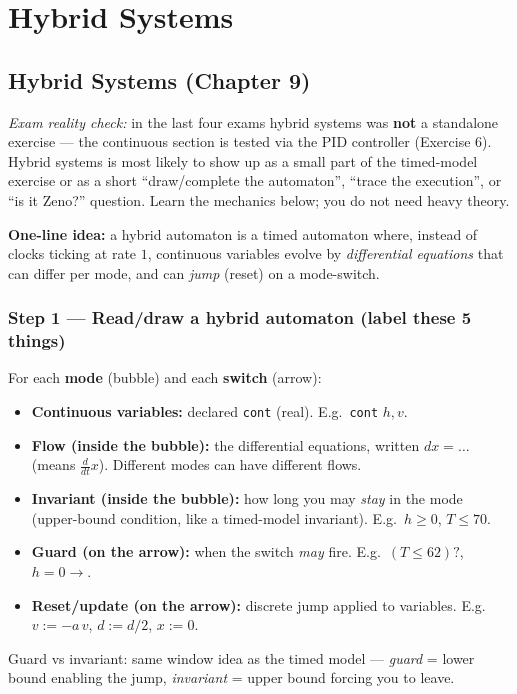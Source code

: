 \chapter{Hybrid Systems}

\section*{Hybrid Systems (Chapter 9)}

\emph{Exam reality check:} in the last four exams hybrid systems was \textbf{not} a standalone
exercise --- the continuous section is tested via the PID controller (Exercise 6). Hybrid systems
is most likely to show up as a small part of the timed-model exercise or as a short
``draw/complete the automaton'', ``trace the execution'', or ``is it Zeno?'' question. Learn the
mechanics below; you do not need heavy theory.

\textbf{One-line idea:} a hybrid automaton is a timed automaton where, instead of clocks ticking at
rate $1$, continuous variables evolve by \emph{differential equations} that can differ per mode,
and can \emph{jump} (reset) on a mode-switch.

\subsection*{Step 1 --- Read/draw a hybrid automaton (label these 5 things)}
For each \textbf{mode} (bubble) and each \textbf{switch} (arrow):
\begin{itemize}
  \item \textbf{Continuous variables:} declared \texttt{cont} (real). E.g.\ \texttt{cont} $h,v$.
  \item \textbf{Flow (inside the bubble):} the differential equations, written $dx = \dots$
        (means $\tfrac{d}{dt}x$). Different modes can have different flows.
  \item \textbf{Invariant (inside the bubble):} how long you may \emph{stay} in the mode
        (upper-bound condition, like a timed-model invariant). E.g.\ $h \ge 0$, $T \le 70$.
  \item \textbf{Guard (on the arrow):} when the switch \emph{may} fire. E.g.\ $(T \le 62)?$,
        $h = 0 \to$.
  \item \textbf{Reset/update (on the arrow):} discrete jump applied to variables. E.g.\
        $v := -a\,v$, $d := d/2$, $x := 0$.
\end{itemize}
Guard vs invariant: same window idea as the timed model --- \emph{guard} = lower bound enabling the
jump, \emph{invariant} = upper bound forcing you to leave.

